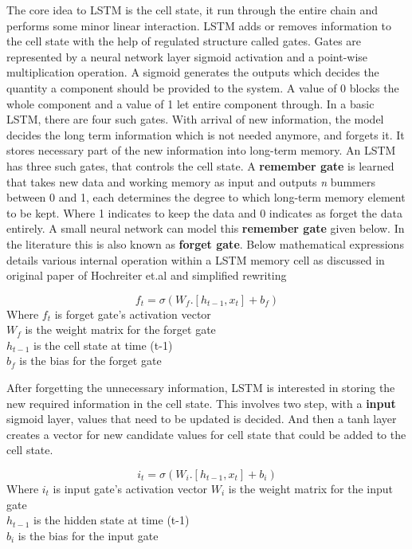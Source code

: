 The core idea to LSTM is the cell state, it run through the entire chain and performs some minor linear interaction. LSTM adds or removes information to the cell state with the help of regulated structure called gates. Gates are represented by a neural network layer sigmoid activation and a point-wise multiplication operation.
A sigmoid generates the outputs which decides the quantity a component should be provided to the system. A value of 0 blocks the whole component and a value of 1 let entire component through. In a basic LSTM, there are four such gates.
With arrival of new information, the model decides the long term information which is not needed anymore, and forgets it. It stores necessary part of the new information into long-term memory. An LSTM has three such gates, that controls the cell state.
A \textbf{remember gate} is learned that takes new data and working memory as input and outputs \textit{n} bummers between 0 and 1, each determines the degree to which long-term memory element to be kept. Where 1 indicates to keep the data and 0 indicates as forget the data entirely. A small neural network can model this \textbf{remember gate} given below. In the literature this is also known as \textbf{forget gate}. Below mathematical expressions details various internal operation within a LSTM memory cell as discussed in original paper of Hochreiter et.al \cite{hochreiter1997long} and simplified rewriting \cite{christopherolah}

\begin{equation}
f_t = \sigma(W_f. [h_{t-1}, x_t  ] + b_f)
\end{equation}
Where $f_t$ is forget gate's activation vector \\
$W_f$ is the weight matrix for the forget gate \\
$h_{t-1}$ is the cell state at time (t-1) \\
$b_f$ is the bias for the forget gate

After forgetting the unnecessary information, LSTM is interested in storing the new required information in the cell state. This involves two step, with a \textbf{input} sigmoid layer, values that need to be updated is decided. And then a tanh layer creates a vector for new candidate values for cell state that could be added to the cell state. 

\begin{equation}
i_t = \sigma(W_i. [h_{t-1}, x_t  ] + b_i)
\end{equation}
Where $i_t$ is input gate's activation vector 
$W_i$ is the weight matrix for the input gate \\
$h_{t-1}$ is the hidden state at time (t-1) \\
$b_i$ is the bias for the input gate

